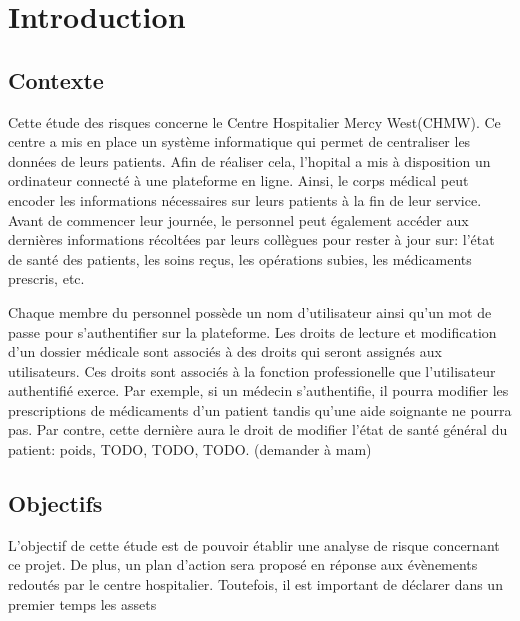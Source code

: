 \documentclass[12pt]{article}
\begin{document}
\newpage
\renewcommand{\contentsname}{Table des matières}
\tableofcontents
\newpage

\section{Introduction}

\subsection{Contexte}

\justify
Cette étude des risques concerne le Centre Hospitalier Mercy West(CHMW). Ce centre a mis en place un système informatique qui permet de centraliser les données de leurs patients. Afin de réaliser cela, l'hopital a mis à disposition un ordinateur connecté à une plateforme en ligne. Ainsi, le corps médical peut encoder les informations nécessaires sur leurs patients à la fin de leur service. Avant de commencer leur journée, le personnel peut également accéder aux dernières informations récoltées par leurs collègues pour rester à jour sur: l'état de santé des patients, les soins reçus, les opérations subies, les médicaments prescris, etc.

\justify
Chaque membre du personnel possède un nom d'utilisateur ainsi qu'un mot de passe pour s'authentifier sur la plateforme. Les droits de lecture et modification d'un dossier médicale sont associés à des droits qui seront assignés aux utilisateurs.  Ces droits sont associés à la fonction professionelle que l'utilisateur authentifié exerce. Par exemple, si un médecin s'authentifie, il pourra modifier les prescriptions de médicaments d'un patient tandis qu'une aide soignante ne pourra pas. Par contre, cette dernière aura le droit de modifier l'état de santé général du patient: poids, TODO, TODO, TODO. (demander à mam)

\subsection{Objectifs}

\justify
L'objectif de cette étude est de pouvoir établir une analyse de risque concernant ce projet. De plus, un plan d'action sera proposé en réponse aux évènements redoutés par le centre hospitalier. Toutefois, il est important de déclarer dans un premier temps les assets
\end{document}
